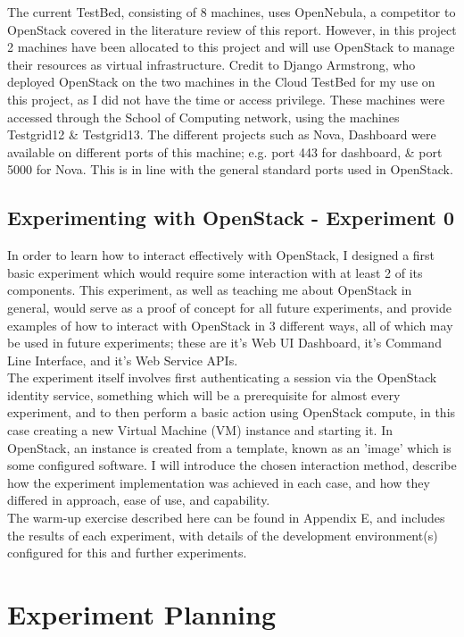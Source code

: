 The current TestBed, consisting of 8 machines, uses OpenNebula, a competitor to OpenStack covered in the literature review of this report. However, in this project 2 machines have been allocated to this project and will use OpenStack to manage their resources as virtual infrastructure. 
Credit to Django Armstrong, who deployed OpenStack on the two machines in the Cloud TestBed for my use on this project, as I did not have the time or access privilege. 
These machines were accessed through the School of Computing network, using the machines Testgrid12 \& Testgrid13. The different projects such as Nova, Dashboard were available on different ports of this machine; e.g. port 443 for dashboard, \& port 5000 for Nova. This is in line with the general standard ports used in OpenStack\cite{openstackports}.  

\subsection{Experimenting with OpenStack - Experiment 0}
In order to learn how to interact effectively with OpenStack, I designed a first basic experiment which would require some interaction with at least 2 of its components. This experiment, as well as teaching me about OpenStack in general, would serve as a proof of concept for all future experiments, and provide examples of how to interact with OpenStack in 3 different ways, all of which may be used in future experiments; these are it's Web UI Dashboard, it's Command Line Interface, and it's Web Service APIs.\\
The experiment itself involves first authenticating a session via the OpenStack identity service, something which will be a prerequisite for almost every experiment, and to then perform a basic action using OpenStack compute, in this case creating a new Virtual Machine (VM) instance and starting it. In OpenStack, an instance is created from a template, known as an 'image' which is some configured software. I will introduce the chosen interaction method, describe how the experiment implementation was achieved in each case, and how they differed in approach, ease of use, and capability.  \\ 
The warm-up exercise described here can be found in Appendix E, and includes the results of each experiment, with details of the development environment(s) configured for this and further experiments.  

\section{Experiment Planning}

